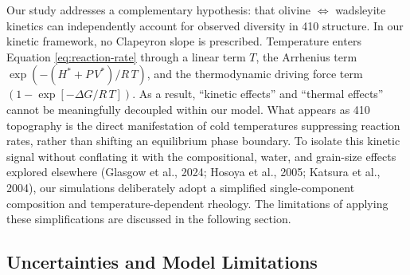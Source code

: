 \documentclass[draft,linenumbers]{agujournal2019}
\begin{document}
Our study addresses a complementary hypothesis: that olivine
\(\Leftrightarrow\) wadsleyite kinetics can independently account for
observed diversity in 410 structure. In our kinetic framework, no
Clapeyron slope is prescribed. Temperature enters Equation
\ref{eq:reaction-rate} through a linear term \(T\), the Arrhenius term
\(\exp\left(-(H^{\ast} + P\, V^{\ast}) / R\, T\right)\), and the
thermodynamic driving force term
\(\left(1 - \exp\left[- \Delta G / R\, T \right]\right)\). As a result,
``kinetic effects'' and ``thermal effects'' cannot be meaningfully
decoupled within our model. What appears as 410 topography is the direct
manifestation of cold temperatures suppressing reaction rates, rather
than shifting an equilibrium phase boundary. To isolate this kinetic
signal without conflating it with the compositional, water, and
grain-size effects explored elsewhere (Glasgow et al., 2024; Hosoya et
al., 2005; {Katsura et al.}, 2004), our simulations deliberately adopt a
simplified single-component composition and temperature-dependent
rheology. The limitations of applying these simplifications are
discussed in the following section.

\subsection{Uncertainties and Model
Limitations}\label{sec:uncertainties-and-model-limitations}
\end{document}
